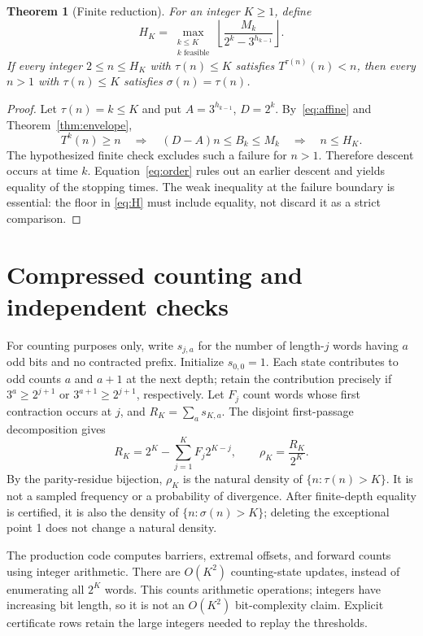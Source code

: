 \documentclass[11pt,a4paper]{amsart}
\newtheorem{theorem}{Theorem}[section]
\theoremstyle{definition}
\theoremstyle{remark}
\begin{document}
\begin{theorem}[Finite reduction]\label{thm:reduction}
For an integer $K\ge1$, define
\begin{equation}\label{eq:H}
H_K=\max_{\substack{k\le K\\k\text{ feasible}}}
\left\lfloor\frac{M_k}{2^k-3^{h_{k-1}}}\right\rfloor.
\end{equation}
If every integer $2\le n\le H_K$ with $\tau(n)\le K$ satisfies
$T^{\tau(n)}(n)<n$, then every $n>1$ with $\tau(n)\le K$ satisfies
$\sigma(n)=\tau(n)$.
\end{theorem}
\begin{proof}
Let $\tau(n)=k\le K$ and put $A=3^{h_{k-1}}$, $D=2^k$.
By~\eqref{eq:affine} and Theorem~\ref{thm:envelope},
\[
T^k(n)\ge n\quad\Longrightarrow\quad
(D-A)n\le B_k\le M_k\quad\Longrightarrow\quad n\le H_K.
\]
The hypothesized finite check excludes such a failure for $n>1$.
Therefore descent occurs at time $k$. Equation~\eqref{eq:order} rules
out an earlier descent and yields equality of the stopping times.
The weak inequality at the failure boundary is essential: the floor in
\eqref{eq:H} must include equality, not discard it as a strict comparison.
\end{proof}

\section{Compressed counting and independent checks}
For counting purposes only, write $s_{j,a}$ for the number of length-$j$
words having $a$ odd bits and no contracted prefix. Initialize
$s_{0,0}=1$. Each state contributes to odd counts $a$ and $a+1$ at the
next depth; retain the contribution precisely if $3^a\ge2^{j+1}$ or
$3^{a+1}\ge2^{j+1}$, respectively. Let $F_j$ count words whose first
contraction occurs at $j$, and $R_K=\sum_a s_{K,a}$. The disjoint
first-passage decomposition gives
\begin{equation}\label{eq:mass}
R_K=2^K-\sum_{j=1}^K F_j2^{K-j},\qquad
\rho_K=\frac{R_K}{2^K}.
\end{equation}
By the parity-residue bijection, $\rho_K$ is the natural density of
$\{n:\tau(n)>K\}$. It is not a sampled frequency or a probability of
divergence. After finite-depth equality is certified, it is also the
density of $\{n:\sigma(n)>K\}$; deleting the exceptional point 1 does
not change a natural density.

The production code computes barriers, extremal offsets, and forward
counts using integer arithmetic. There are $O(K^2)$ counting-state
updates, instead of enumerating all $2^K$ words. This counts arithmetic
operations; integers have increasing bit length, so it is not an
$O(K^2)$ bit-complexity claim. Explicit certificate rows retain the
large integers needed to replay the thresholds.
\end{document}
